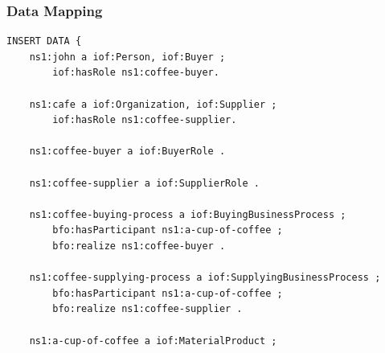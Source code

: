 \subsubsection*{Data Mapping}
\begin{verbatim}
INSERT DATA {
    ns1:john a iof:Person, iof:Buyer ;
        iof:hasRole ns1:coffee-buyer.
    
    ns1:cafe a iof:Organization, iof:Supplier ;
        iof:hasRole ns1:coffee-supplier.
    
    ns1:coffee-buyer a iof:BuyerRole .
    
    ns1:coffee-supplier a iof:SupplierRole .
    
    ns1:coffee-buying-process a iof:BuyingBusinessProcess ;
        bfo:hasParticipant ns1:a-cup-of-coffee ;
        bfo:realize ns1:coffee-buyer .
    
    ns1:coffee-supplying-process a iof:SupplyingBusinessProcess ;
        bfo:hasParticipant ns1:a-cup-of-coffee ;
        bfo:realize ns1:coffee-supplier .
    
    ns1:a-cup-of-coffee a iof:MaterialProduct ;
\end{verbatim}



